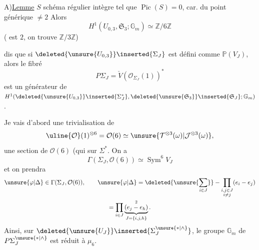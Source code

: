 
A)\quad \uline{Lemme}\quad
$S$ schéma 
régulier intègre tel que $\operatorname{Pic}(S)=0$,
car. du point générique $\ne2$ Alors 
\[
H^1(U_{0,3},\mathfrak S_3;\mathbb G_m)\simeq\mathbb Z/6\mathbb Z
\]
( est $2$, on trouve $\mathbb Z/3\mathbb Z$)


 dis que si 
$\deleted{\unsure{U_{0,3}}}\inserted{\Sigma_J}$ est défini comme $\mathbb P(V_J)$, 
alors le fibré 
\[
P\Sigma_J=\check V(\mathcal O_{\Sigma_J}(1))^{*}
\]
est un générateur de
$H^1(\deleted{\unsure{U_{0,3}}}\inserted{\Sigma_J^*},
\deleted{\unsure{\mathfrak S_3}}\inserted{\mathfrak S_J};\mathbb G_m)$.

Je vais d'abord  une trivialisation de
\[
\uline{\mathcal O}(1)^{\otimes6}=\mathcal O(6)\simeq
\unsure{\mathcal T^{\otimes3}(\omega)|\mathcal J^{\otimes3}(\omega)},
\]
  une section de $\mathcal O(6)$
(qui 
 sur $\Sigma^*$.
On  a
\[
\Gamma(\Sigma_J,\mathcal O(6))\simeq\operatorname{Sym}^{6}V_J
\]
et on prendra
\[
\begin{gathered}
\unsure{\varphi|\Delta}\in\Gamma(\Sigma_J,\mathcal O(6)),\qquad
\unsure{\varphi|\Delta}
=\deleted{\unsure{\sum_{i\in J}}}
-\prod_{\substack{i,j\in J\\i\ne j}}(e_i-e_j)\\
=\prod_{i\in J}\underbrace{(e_j-e_h)}_{J=\{i,j,h\}}^{2}.
\end{gathered}
\]
Ainsi, sur $\deleted{\unsure{U_J}}\inserted{\Sigma_J^{\unsure{*|\wedge}}}$, le groupe 
$\mathbb G_m$ de $P\Sigma_J^{\unsure{*|\wedge}}$ est réduit à $\mu_6$.

